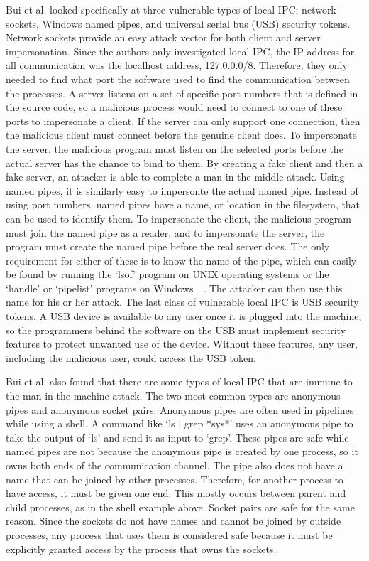 Bui et al. looked specifically at three vulnerable types of local IPC: network sockets, Windows named pipes, and universal serial bus (USB) security tokens.  Network sockets provide an easy attack vector for both client and server impersonation.  Since the authors only investigated local IPC, the IP address for all communication was the localhost address, 127.0.0.0/8.  Therefore, they only needed to find what port the software used to find the communication between the processes.  A server listens on a set of specific port numbers that is defined in the source code, so a malicious process would need to connect to one of these ports to impersonate a client.  If the server can only support one connection, then the malicious client must connect before the genuine client does.  To impersonate the server, the malicious program must listen on the selected ports before the actual server has the chance to bind to them.  By creating a fake client and then a fake server, an attacker is able to complete a man-in-the-middle attack.  Using named pipes, it is similarly easy to impersonte the actual named pipe.  Instead of using port numbers, named pipes have a name, or location in the filesystem, that can be used to identify them.  To impersonate the client, the malicious program must join the named pipe as a reader, and to impersonate the server, the program must create the named pipe before the real server does.  The only requirement for either of these is to know the name of the pipe, which can easily be found by running the `lsof' program on UNIX operating systems or the `handle' or `pipelist' programs on Windows~\cite{russinovich_2018}~\cite{markruss_sharkey_2016}.  The attacker can then use this name for his or her attack.  The last class of vulnerable local IPC is USB security tokens.  A USB device is available to any user once it is plugged into the machine, so the programmers behind the software on the USB must implement security features to protect unwanted use of the device.  Without these features, any user, including the malicious user, could access the USB token.

Bui et al. also found that there are some types of local IPC that are immune to the man in the machine attack.  The two most-common types are anonymous pipes and anonymous socket pairs.  Anonymous pipes are often used in pipelines while using a shell.  A command like `ls | grep *sys*' uses an anonymous pipe to take the output of `ls' and send it as input to `grep'.  These pipes are safe while named pipes are not because the anonymous pipe is created by one process, so it owns both ends of the communication channel.  The pipe also does not have a name that can be joined by other processes.  Therefore, for another process to have access, it must be given one end.  This mostly occurs between parent and child processes, as in the shell example above.  Socket pairs are safe for the same reason.  Since the sockets do not have names and cannot be joined by outside processes, any process that uses them is considered safe because it must be explicitly granted access by the process that owns the sockets.

